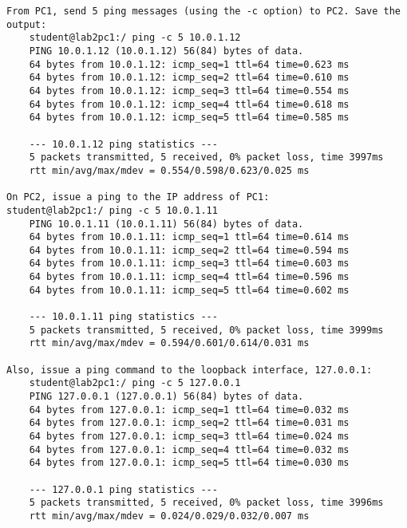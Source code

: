 \begin{lstlisting}
From PC1, send 5 ping messages (using the -c option) to PC2. Save the output:
	student@lab2pc1:/ ping -c 5 10.0.1.12
	PING 10.0.1.12 (10.0.1.12) 56(84) bytes of data.
	64 bytes from 10.0.1.12: icmp_seq=1 ttl=64 time=0.623 ms
	64 bytes from 10.0.1.12: icmp_seq=2 ttl=64 time=0.610 ms
	64 bytes from 10.0.1.12: icmp_seq=3 ttl=64 time=0.554 ms
	64 bytes from 10.0.1.12: icmp_seq=4 ttl=64 time=0.618 ms
	64 bytes from 10.0.1.12: icmp_seq=5 ttl=64 time=0.585 ms

	--- 10.0.1.12 ping statistics ---
	5 packets transmitted, 5 received, 0% packet loss, time 3997ms
	rtt min/avg/max/mdev = 0.554/0.598/0.623/0.025 ms

On PC2, issue a ping to the IP address of PC1:
student@lab2pc1:/ ping -c 5 10.0.1.11
	PING 10.0.1.11 (10.0.1.11) 56(84) bytes of data.
	64 bytes from 10.0.1.11: icmp_seq=1 ttl=64 time=0.614 ms
	64 bytes from 10.0.1.11: icmp_seq=2 ttl=64 time=0.594 ms
	64 bytes from 10.0.1.11: icmp_seq=3 ttl=64 time=0.603 ms
	64 bytes from 10.0.1.11: icmp_seq=4 ttl=64 time=0.596 ms
	64 bytes from 10.0.1.11: icmp_seq=5 ttl=64 time=0.602 ms

	--- 10.0.1.11 ping statistics ---
	5 packets transmitted, 5 received, 0% packet loss, time 3999ms
	rtt min/avg/max/mdev = 0.594/0.601/0.614/0.031 ms

Also, issue a ping command to the loopback interface, 127.0.0.1:
	student@lab2pc1:/ ping -c 5 127.0.0.1
	PING 127.0.0.1 (127.0.0.1) 56(84) bytes of data.
	64 bytes from 127.0.0.1: icmp_seq=1 ttl=64 time=0.032 ms
	64 bytes from 127.0.0.1: icmp_seq=2 ttl=64 time=0.031 ms
	64 bytes from 127.0.0.1: icmp_seq=3 ttl=64 time=0.024 ms
	64 bytes from 127.0.0.1: icmp_seq=4 ttl=64 time=0.032 ms
	64 bytes from 127.0.0.1: icmp_seq=5 ttl=64 time=0.030 ms

	--- 127.0.0.1 ping statistics ---
	5 packets transmitted, 5 received, 0% packet loss, time 3996ms
	rtt min/avg/max/mdev = 0.024/0.029/0.032/0.007 ms


\end{lstlisting}